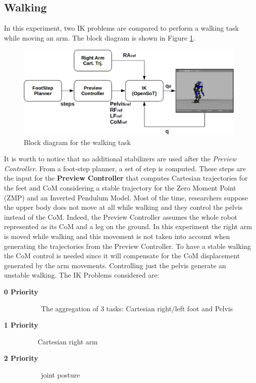 \subsection{Walking}
In this experiment, two IK problems are compared to perform a walking task while moving an arm. The block diagram is shown in Figure \ref{walk_block_diagram}.
\begin{figure}[!h]
\vspace{2 mm}
\centering
\includegraphics[width=\textwidth]{gfx/walking_block_diagram.eps}
\caption{Block diagram for the walking task}
\label{walk_block_diagram}
\end{figure}
It is worth to notice that no additional stabilizers are used after the \emph{Preview Controller}.
From a foot-step planner, a set of step is computed. These steps are the input for the \textbf{Preview Controller} \cite{Kajita:03} that computes Cartesian trajectories for the feet and CoM considering a stable trajectory for the Zero Moment Point (ZMP) and an Inverted Pendulum Model. Most of the time, researchers suppose the upper body does not move at all while walking and they control the pelvis instead of the CoM. Indeed, the Preview Controller assumes the whole robot represented as its CoM and a leg on the ground. In this experiment the right arm is moved while walking and this movement is not taken into account when generating the trajectories from the Preview Controller. To have a stable walking the CoM control is needed since it will compensate for the CoM displacement generated by the arm movements. Controlling just the pelvis generate an unstable walking. 
The IK Problems considered are:
\begin{description}
\item[\bf{0 Priority}] \ \ \ \ \ The aggregation of 3 tasks: Cartesian right/left foot and Pelvis 
\item[\bf{1 Priority}] \ \ \ \  Cartesian right arm
\item[\bf{2 Priority}] \ \ \ \ \ joint posture 
\end{description}
